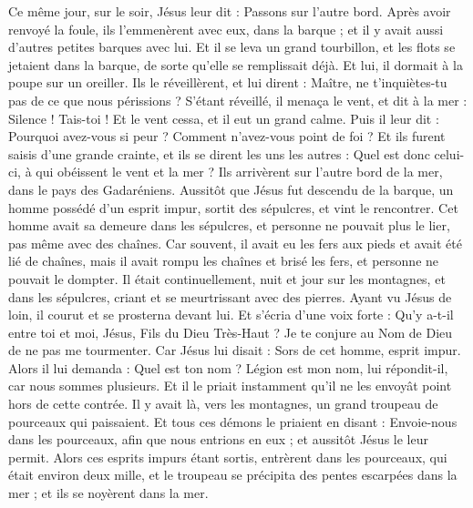 \begin{multicols}{2}
Ce même jour, sur le soir, Jésus leur dit : Passons sur l’autre bord.
Après avoir renvoyé la foule, ils l'emmenèrent avec eux, dans la barque ; et il y avait aussi d'autres petites barques avec lui.
Et il se leva un grand tourbillon, et les flots se jetaient dans la barque, de sorte qu'elle se remplissait déjà.
Et lui, il dormait à la poupe sur un oreiller. Ils le réveillèrent, et lui dirent : Maître, ne t’inquiètes-tu pas de ce que nous périssions ?
S’étant réveillé, il menaça le vent, et dit à la mer : Silence ! Tais-toi ! Et le vent cessa, et il eut un grand calme.
Puis il leur dit : Pourquoi avez-vous si peur ? Comment n'avez-vous point de foi ?
Et ils furent saisis d'une grande crainte, et ils se dirent les uns les autres : Quel est donc celui-ci, à qui obéissent le vent et la mer ?
\VerseOne{}Ils arrivèrent sur l’autre bord de la mer, dans le pays des Gadaréniens.
Aussitôt que Jésus fut descendu de la barque, un homme possédé d’un esprit impur, sortit des sépulcres, et vint le rencontrer.
Cet homme avait sa demeure dans les sépulcres, et personne ne pouvait plus le lier, pas même avec des chaînes.
Car souvent, il avait eu les fers aux pieds et avait été lié de chaînes, mais il avait rompu les chaînes et brisé les fers, et personne ne pouvait le dompter.
Il était continuellement, nuit et jour sur les montagnes, et dans les sépulcres, criant et se meurtrissant avec des pierres.
Ayant vu Jésus de loin, il courut et se prosterna devant lui.
Et s’écria d’une voix forte : Qu'y a-t-il entre toi et moi, Jésus, Fils du Dieu Très-Haut ? Je te conjure au Nom de Dieu de ne pas me tourmenter.
Car Jésus lui disait : Sors de cet homme, esprit impur.
Alors il lui demanda : Quel est ton nom ? Légion{} est mon nom, lui répondit-il, car nous sommes plusieurs.
Et il le priait instamment qu'il ne les envoyât point hors de cette contrée.
Il y avait là, vers les montagnes, un grand troupeau de pourceaux qui paissaient.
Et tous ces démons le priaient en disant : Envoie-nous dans les pourceaux, afin que nous entrions en eux ; et aussitôt Jésus le leur permit.
Alors ces esprits impurs étant sortis, entrèrent dans les pourceaux, qui était environ deux mille, et le troupeau se précipita des pentes escarpées dans la mer ; et ils se noyèrent dans la mer.

\end{multicols}
